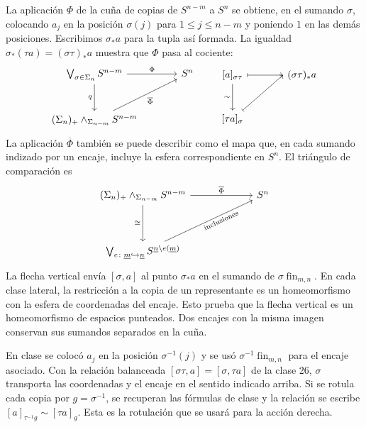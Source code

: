 La aplicación $\Phi$ de la cuña de copias de $S^{n-m}$ a $S^n$ se obtiene, en el sumando $\sigma$, colocando $a_j$ en la posición $\sigma(j)$ para $1\leq j\leq n-m$ y poniendo $1$ en las demás posiciones. Escribimos $\sigma_*a$ para la tupla así formada. La igualdad $\sigma_*(\tau a)=(\sigma\tau)_*a$ muestra que $\Phi$ pasa al cociente:
\[
\begin{tikzcd}[column sep=large,row sep=large]
\textstyle\bigvee\nolimits_{\sigma\in\Sigma_n}S^{n-m}
\arrow[r,"\Phi"]\arrow[d,"q"']&S^n\\
(\Sigma_n)_+\wedge_{\Sigma_{n-m}}S^{n-m}
\arrow[ur,"\overline{\Phi}"']&
\end{tikzcd}
\qquad
\begin{tikzcd}[column sep=large,row sep=large]
{[a]_{\sigma\tau}}\arrow[r,mapsto]\arrow[d,"\sim"']&(\sigma\tau)_*a\\
{[\tau a]_\sigma}\arrow[ur,mapsto,end anchor=west]&
\end{tikzcd}
\]
La aplicación $\overline{\Phi}$ también se puede describir como el mapa que, en cada sumando indizado por un encaje, incluye la esfera correspondiente en $S^n$. El triángulo de comparación es
\[
\begin{tikzcd}[column sep=22mm,row sep=13mm]
(\Sigma_n)_+\wedge_{\Sigma_{n-m}}S^{n-m}
  \arrow[r,"\overline{\Phi}"]\arrow[d,"\cong"']&S^n\\
\textstyle\bigvee\nolimits_{e\colon\underline m\hookrightarrow\underline n}
S^{\underline n\setminus e(\underline m)}
  \arrow[ur,"\text{inclusiones}"'{sloped,pos=.62}]&
\end{tikzcd}
\]
La flecha vertical envía $[\sigma,a]$ al punto $\sigma_*a$ en el sumando de $\sigma\operatorname{fin}_{m,n}$. En cada clase lateral, la restricción a la copia de un representante es un homeomorfismo con la esfera de coordenadas del encaje. Esto prueba que la flecha vertical es un homeomorfismo de espacios punteados. Dos encajes con la misma imagen conservan sus sumandos separados en la cuña.

\begin{nota}
En clase se colocó $a_j$ en la posición $\sigma^{-1}(j)$ y se usó $\sigma^{-1}\operatorname{fin}_{m,n}$ para el encaje asociado. Con la relación balanceada $[\sigma\tau,a]=[\sigma,\tau a]$ de la clase 26, $\sigma$ transporta las coordenadas y el encaje en el sentido indicado arriba. Si se rotula cada copia por $g=\sigma^{-1}$, se recuperan las fórmulas de clase y la relación se escribe $[a]_{\tau^{-1}g}\sim[\tau a]_g$. Esta es la rotulación que se usará para la acción derecha.
\end{nota}

